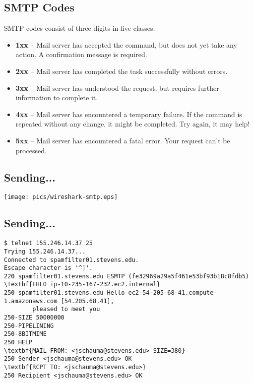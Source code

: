 \documentclass[xga]{xdvislides}
\begin{document}
\subsection{SMTP Codes}
SMTP codes consist of three digits in five classes:
\begin{itemize}
	\item {\bf 1xx} --  Mail server has accepted the command, but does not yet
		take any action. A confirmation message is required.
	\item {\bf 2xx} --  Mail server has completed the task successfully
		without errors.
	\item {\bf 3xx} --  Mail server has understood the request, but requires
		further information to complete it.
	\item {\bf 4xx} --  Mail server has encountered a temporary failure. If
		the command is repeated without any change, it might be
		completed. Try again, it may help!
	\item {\bf 5xx} --  Mail server has encountered a fatal error. Your
		request can't be processed.
\end{itemize}

\subsection{Sending...}
\begin{center}
	\texttt{[image: pics/wireshark-smtp.eps]}
\end{center}

\subsection{Sending...}
\begin{Verbatim}
$ telnet 155.246.14.37 25
Trying 155.246.14.37...
Connected to spamfilter01.stevens.edu.
Escape character is '^]'.
220 spamfilter01.stevens.edu ESMTP (fe32969a29a5f461e53bf93b18c8fdb5)
\textbf{EHLO ip-10-235-167-232.ec2.internal}
250-spamfilter01.stevens.edu Hello ec2-54-205-68-41.compute-1.amazonaws.com [54.205.68.41],
        pleased to meet you
250-SIZE 50000000
250-PIPELINING
250-8BITMIME
250 HELP
\textbf{MAIL FROM: <jschauma@stevens.edu> SIZE=380}
250 Sender <jschauma@stevens.edu> OK
\textbf{RCPT TO: <jschauma@stevens.edu>}
250 Recipient <jschauma@stevens.edu> OK
\end{Verbatim}
\end{document}
